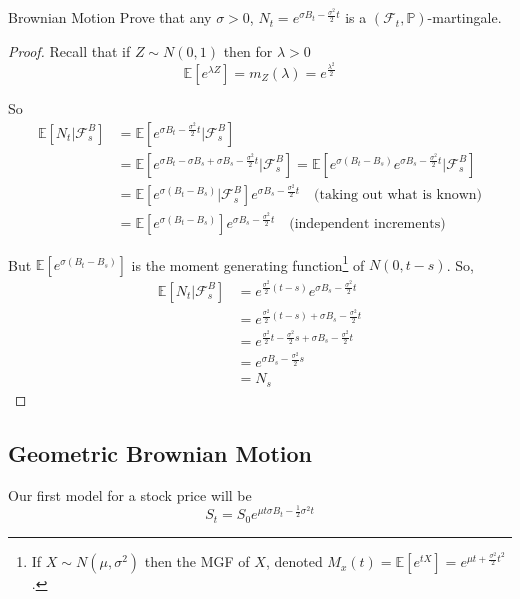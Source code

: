 \documentclass[12pt]{article}
\begin{document}
\begin{section}{Brownian Motion}
Prove that any $\sigma>0$, $N_t = e^{\sigma B_t - \frac{\sigma^2}{2}t}$ is a $(\mathcal F_t, \mathbb P)$-martingale.

\begin{proof} Recall that if $Z\sim N(0,1)$ then for $\lambda > 0$
\begin{equation*}
	\mathbb E[e^{\lambda Z}] = m_Z(\lambda) = e^{\frac{\lambda^2}{2}}
\end{equation*}

So
\begin{align*}
	\mathbb E[N_t|\mathcal F^B_s]  &= \mathbb E[e^{\sigma B_t - \frac{\sigma^2}{2}t}|\mathcal F^B_s] \\
	&= \mathbb E[e^{\sigma B_t -\sigma B_s + \sigma B_s - \frac{\sigma^2}{2}t}|\mathcal F^B_s] = \mathbb E[e^{\sigma(B_t - B_s)}e^{\sigma B_s - \frac{\sigma^2}{2}t}|\mathcal F^B_s] \\
	&=  \mathbb E[e^{\sigma(B_t - B_s)}|\mathcal F^B_s]e^{\sigma B_s - \frac{\sigma^2}{2}t} \quad \text{(taking out what is known)} \\
	&= \mathbb E[e^{\sigma(B_t - B_s)}]e^{\sigma B_s - \frac{\sigma^2}{2}t} \quad \text{(independent increments)}
\end{align*}

But $\mathbb E[e^{\sigma(B_t - B_s)}]$ is the moment generating function\footnote{If $X \sim N(\mu, \sigma^2)$ then the MGF of $X$, denoted $M_x(t) = \mathbb E[ e^{tX} ] = e^{\mu t + \frac{\sigma^2}{2}t^2}$.} of $N(0, t - s)$. So,
\begin{align*}
	\mathbb E[N_t|\mathcal F^B_s] &= e^{\frac{\sigma^2}{2}(t-s)}e^{\sigma B_s - \frac{\sigma^2}{2}t} \\
	&= e^{\frac{\sigma^2}{2}(t-s) + \sigma B_s - \frac{\sigma^2}{2}t} \\
	&= e^{\frac{\sigma^2}{2}t - \frac{\sigma^2}{2}s + \sigma B_s - \frac{\sigma^2}{2}t} \\
	&= e^{\sigma B_s - \frac{\sigma^2}{2}s} \\
	&= N_s
\end{align*}
\end{proof}

\subsection{Geometric Brownian Motion}

Our first model for a stock price will be
\begin{equation*}
	S_t = S_0 e^{\mu t \sigma B_t - \frac{1}{2}\sigma^2 t}
\end{equation*}


\end{section}
\end{document}

